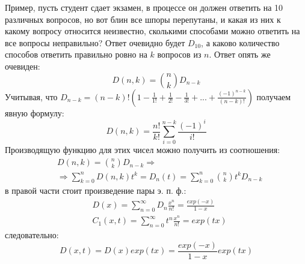 Пример, пусть студент сдает экзамен, в процессе он должен ответить на 10 различных вопросов, но вот блин все шпоры перепутаны, и какая из них к какому вопросу относится неизвестно, сколькими способами можно ответить на все вопросы неправильно?
Ответ очевидно будет $D_{10}$, а каково количество способов ответить правильно ровно на $k$ вопросов из $n$. Ответ опять же очевиден:
\[
	D\left(n,k\right) = \binom{n}{k} D_{n-k}
\]
Учитывая, что $D_{n-k} = \left(n-k\right)! \left(1 - \frac{1}{1!} + \frac{1}{2!} - \frac{1}{3!} + ... + \frac{\left(-1\right)^{n-k}}{\left(n-k\right)!}\right)$ получаем явную формулу:
\[
	D\left(n,k\right) = \frac{n!}{k!} \sum_{i=0}^{n-k} \frac{\left(-1\right)^i}{i!}
\]
Производящую функцию для этих чисел можно получить из соотношения:
\[
	\begin{split}
		& D\left(n,k\right) = \binom{n}{k} D_{n-k} \Rightarrow\\
		& \Rightarrow \sum_{k=0}^n D\left(n,k\right) t^k = D_n\left(t\right) = \sum_{k=0}^n \binom{n}{k}t^k D_{n-k}
	\end{split}
\]
в правой части стоит произведение пары э. п. ф.:
\[
	\begin{split}
		& D\left(x\right) = \sum_{n=0}^{\infty} D_n \frac{x^n}{n!} = \frac{exp\left(-x\right)}{1-x}\\
		& C_1\left(x,t\right) = \sum_{n=0}^{\infty} t^n \frac{x^n}{n!} = exp\left(tx\right)
	\end{split}
\]
следовательно:
\[
	D\left(x,t\right) = D\left(x\right) exp\left(tx\right) = \frac{exp\left(-x\right)}{1-x} exp\left(tx\right)
\]